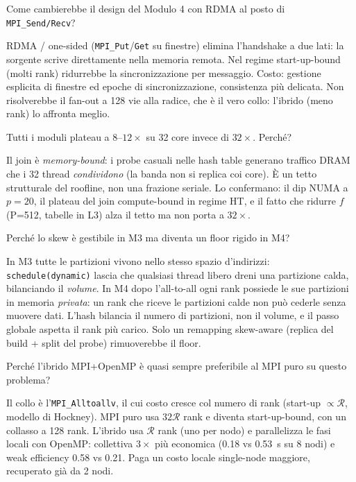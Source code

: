 \documentclass[11pt,a4paper]{article}
\theoremstyle{remark}
\newenvironment{esercizio}[1][]{%
  \begin{tcolorbox}[breakable,title={\textbf{Esercizio / Domanda d'esame}\ifx&#1&\else: #1\fi},
    colback=yellow!5!white, colframe=orange!75!black, fonttitle=\small\bfseries]%
}{%
  \end{tcolorbox}%
}
\newenvironment{risposta}{%
  \begin{tcolorbox}[breakable,title={\textbf{Risposta}},
    colback=green!5!white, colframe=green!50!black, fonttitle=\small\bfseries]%
}{%
  \end{tcolorbox}%
}
\begin{document}
\begin{esercizio}[5 -- RDMA in M4]
Come cambierebbe il design del Modulo 4 con RDMA al posto di \texttt{MPI\_Send/Recv}?
\end{esercizio}
\begin{risposta}
RDMA / one-sided (\texttt{MPI\_Put}/\texttt{Get} su finestre) elimina l'handshake a due lati: la sorgente scrive direttamente nella memoria remota. Nel regime start-up-bound (molti rank) ridurrebbe la sincronizzazione per messaggio. Costo: gestione esplicita di finestre ed epoche di sincronizzazione, consistenza pi\`u delicata. Non risolverebbe il fan-out a 128 vie alla radice, che \`e il vero collo: l'ibrido (meno rank) lo affronta meglio.
\end{risposta}

\begin{esercizio}[6 -- Perch\'e nessun modulo raggiunge speedup lineare?]
Tutti i moduli plateau a $8$--$12\times$ su 32 core invece di $32\times$. Perch\'e?
\end{esercizio}
\begin{risposta}
Il join \`e \emph{memory-bound}: i probe casuali nelle hash table generano traffico DRAM che i 32 thread \emph{condividono} (la banda non si replica coi core). \`E un tetto strutturale del roofline, non una frazione seriale. Lo confermano: il dip NUMA a $p=20$, il plateau del join compute-bound in regime HT, e il fatto che ridurre $f$ (P=512, tabelle in L3) alza il tetto ma non porta a $32\times$.
\end{risposta}

\begin{esercizio}[7 -- Skew: shared vs distribuito]
Perch\'e lo skew \`e gestibile in M3 ma diventa un floor rigido in M4?
\end{esercizio}
\begin{risposta}
In M3 tutte le partizioni vivono nello stesso spazio d'indirizzi: \texttt{schedule(dynamic)} lascia che qualsiasi thread libero dreni una partizione calda, bilanciando il \emph{volume}. In M4 dopo l'all-to-all ogni rank possiede le sue partizioni in memoria \emph{privata}: un rank che riceve le partizioni calde non pu\`o cederle senza muovere dati. L'hash bilancia il numero di partizioni, non il volume, e il passo globale aspetta il rank pi\`u carico. Solo un remapping skew-aware (replica del build + split del probe) rimuoverebbe il floor.
\end{risposta}

\begin{esercizio}[8 -- Ibrido vs MPI puro]
Perch\'e l'ibrido MPI+OpenMP \`e quasi sempre preferibile al MPI puro su questo problema?
\end{esercizio}
\begin{risposta}
Il collo \`e l'\texttt{MPI\_Alltoallv}, il cui costo cresce col numero di rank (start-up $\propto\mathcal{R}$, modello di Hockney). MPI puro usa $32\mathcal{R}$ rank e diventa start-up-bound, con un collasso a 128 rank. L'ibrido usa $\mathcal{R}$ rank (uno per nodo) e parallelizza le fasi locali con OpenMP: collettiva $3\times$ pi\`u economica (0.18 vs 0.53~s su 8 nodi) e weak efficiency 0.58 vs 0.21. Paga un costo locale single-node maggiore, recuperato gi\`a da 2 nodi.
\end{risposta}
\end{document}
